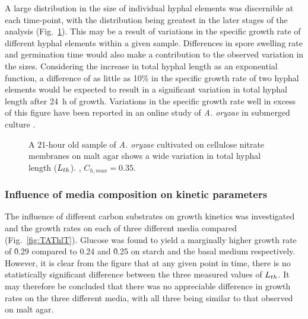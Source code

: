 A large distribution in the size of individual hyphal elements was discernible at each time-point, with the distribution being greatest in the later stages of the analysis (Fig.~\ref{fig:ThlDist}). This may be a result of variations in the specific growth rate of different hyphal elements within a given sample. Differences in spore swelling rate and germination time would also make a contribution to the observed variation in the sizes. Considering the increase in total hyphal length as an exponential function, a difference of as little as 10\% in the specific growth rate of two hyphal elements would be expected to result in a significant variation in total hyphal length after 24~h of growth. Variations in the specific growth rate well in excess of this figure have been reported in an online study of \emph{A. oryzae} in submerged culture \cite{spohr1998}.

\begin{figure}[t]
	\centering
	\caption{A 21-hour old sample of \emph{A. oryzae} cultivated on cellulose nitrate membranes on malt agar shows a wide variation in total hyphal length ($L_{th}$). , $C_{h,max} = 0.35$.}
	\label{fig:ThlDist}
\end{figure}

\subsubsection{Influence of media composition on kinetic parameters}

The influence of different carbon substrates on growth kinetics was investigated and the growth rates on each of three different media compared (Fig.~\ref{fig:TAThlT}). Glucose was found to yield a marginally higher growth rate of \h{0.29} compared to 0.24 and \h{0.25} on starch and the basal medium respectively. However, it is clear from the figure that at any given point in time, there is no statistically significant difference between the three measured values of $L_{th}$. It may therefore be concluded that there was no appreciable difference in growth rates on the three different media, with all three being similar to that observed on malt agar.

